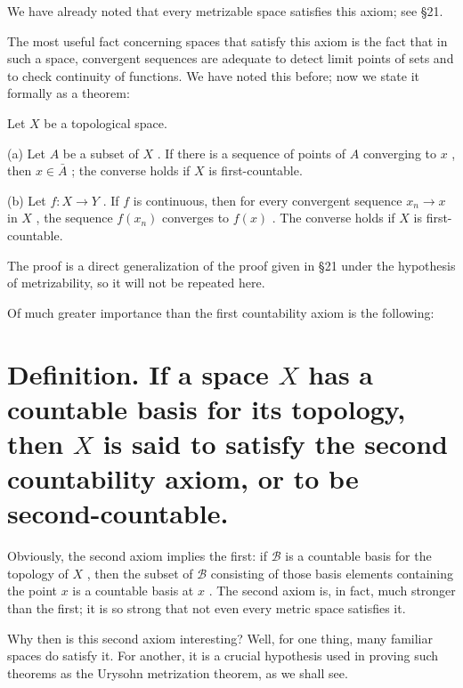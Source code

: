 We have already noted that every metrizable space satisfies this axiom; see §21.

The most useful fact concerning spaces that satisfy this axiom is the fact that in such a space, convergent sequences are adequate to detect limit points of sets and to check continuity of functions. We have noted this before; now we state it formally as a theorem:

\begin{theorem}
	Let \(X\) be a topological space.

(a) Let \(A\) be a subset of \(X\) . If there is a sequence of points of \(A\) converging to \(x\) , then \(x \in  \bar{A}\) ; the converse holds if \(X\) is first-countable.

(b) Let \(f : X \rightarrow  Y\) . If \(f\) is continuous, then for every convergent sequence \({x}_{n} \rightarrow  x\) in \(X\) , the sequence \(f\left( {x}_{n}\right)\) converges to \(f\left( x\right)\) . The converse holds if \(X\) is first-countable.

The proof is a direct generalization of the proof given in §21 under the hypothesis of  metrizability, so it will not be repeated here.

Of much greater importance than the first countability axiom is the following:

\end{theorem}
\section*{Definition. If a space \(X\) has a countable basis for its topology, then \(X\) is said to satisfy the second countability axiom, or to be  second-countable.}

Obviously, the second axiom implies the first: if \(\mathcal{B}\) is a countable basis for the topology of \(X\) , then the subset of \(\mathcal{B}\) consisting of those basis elements containing the point \(x\) is a countable basis at \(x\) . The second axiom is, in fact, much stronger than the first; it is so strong that not even every metric space satisfies it.

Why then is this second axiom interesting? Well, for one thing, many familiar spaces do satisfy it. For another, it is a crucial hypothesis used in proving such theorems as the Urysohn metrization theorem, as we shall see.

